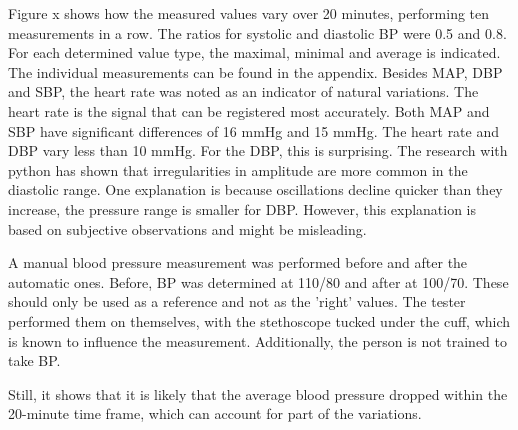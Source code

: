 Figure x shows how the measured values vary over 20 minutes, performing ten measurements in a row. The ratios for systolic and diastolic BP were 0.5 and 0.8. For each determined value type, the maximal, minimal and average is indicated. The individual measurements can be found in the appendix. Besides MAP, DBP and SBP, the heart rate was noted as an indicator of natural variations. The heart rate is the signal that can be registered most accurately. Both MAP and SBP have significant differences of 16 mmHg and 15 mmHg. The heart rate and DBP vary less than 10 mmHg. For the DBP, this is surprising. The research with python has shown that irregularities in amplitude are more common in the diastolic range. One explanation is because oscillations decline quicker than they increase, the pressure range is smaller for DBP. However, this explanation is based on subjective observations and might be misleading. 

A manual blood pressure measurement was performed before and after the automatic ones. Before, BP was determined at 110/80 and after at 100/70. These should only be used as a reference and not as the 'right' values. The tester performed them on themselves, with the stethoscope tucked under the cuff, which is known to influence the measurement. Additionally, the person is not trained to take BP. 

Still, it shows that it is likely that the average blood pressure dropped within the 20-minute time frame, which can account for part of the variations.

